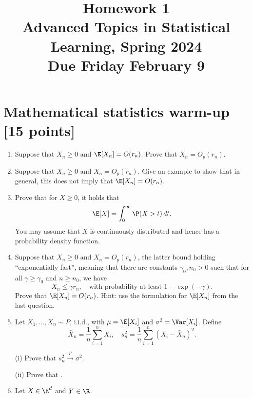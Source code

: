 \documentclass{article}
\title{Homework 1 \\ \smallskip
\large Advanced Topics in Statistical Learning, Spring 2024 \\ \smallskip
Due Friday February 9}
\date{}
\begin{document}
\maketitle
\RaggedRight
\vspace{-50pt}

\section{Mathematical statistics warm-up [15 points]}

\def\pto{\overset{p}{\to}}
\def\dto{\overset{d}{\to}}

\begin{enumerate}[label=(\alph*)]
\item Suppose that $X_n \geq 0$ and $\E[X_n]=O(r_n)$. Prove that $X_n=O_p(r_n)$.
  \marginpar{\small [1 pt]} 

\item Suppose that $X_n \geq 0$ and $X_n=O_p(r_n)$.  Give an example to show
  that in general, this does not  imply that $\E[X_n]=O(r_n)$.   
  \marginpar{\small [1 pt]} 

\item Prove that for $X \geq 0$, it holds that 
  \[
  \E[X] = \int_0^\infty \P(X>t) \, dt.
  \]  
  You may assume that $X$ is continuously distributed and hence has a probability
  density function. 
  \marginpar{\small [2 pts]} 

\item Suppose that $X_n \geq 0$ and $X_n=O_p(r_n)$, the latter bound holding
  ``exponentially fast'', meaning that there are constants $\gamma_0,n_0>0$ such 
  that for all $\gamma \geq \gamma_0$ and $n \geq n_0$, we have    
  \[
  X_n \leq \gamma r_n, \quad \text{with probability at least $1-\exp(-\gamma)$}.    
  \]
  Prove that $\E[X_n]=O(r_n)$. Hint: use the formulation for $\E[X_n]$ from the
  last question. 
  \marginpar{\small [3 pts]} 

\item Let $X_1,\ldots, X_n \sim P$, i.i.d., with $\mu = \E[X_i]$ and $\sigma^2 = 
  \Var[X_i]$. Define   
  \[
  \bar{X}_n = \frac{1}{n}\sum_{i=1}^n X_i, \quad
  s_n^2 = \frac{1}{n}\sum_{i=1}^n (X_i - \bar{X}_n)^2.
  \]

(i) Prove that $s_n^2 \pto \sigma^2$.
\marginpar{\small [1 pt]} 

(ii) Prove that \smash{$\sqrt{n}(\bar{X}_n-\mu)/s_n \dto N(0,1)$}.
\marginpar{\small [1 pt]} 

\item Let $X  \in \R^d$ and $Y \in \R$.


\end{enumerate}
\end{document}
